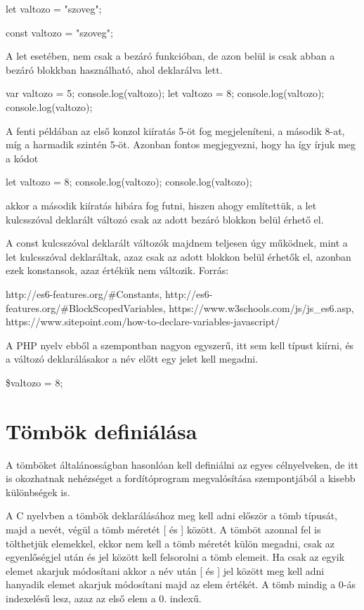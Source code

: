 \begin{cpp}
	let valtozo = "szoveg";
	
	const valtozo = "szoveg";
\end{cpp}

A let esetében, nem csak a bezáró funkcióban, de azon belül is csak abban a bezáró blokkban használható, ahol deklarálva lett.

\begin{cpp}
	var valtozo = 5;
	console.log(valtozo);
	{
		let valtozo = 8;
		console.log(valtozo);
	}
	console.log(valtozo);
\end{cpp}

A fenti példában az első konzol kiíratás 5-öt fog megjeleníteni, a második 8-at, míg a harmadik szintén 5-öt. Azonban fontos megjegyezni, hogy ha így írjuk meg a kódot

\begin{cpp}
	{
		let valtozo = 8;
		console.log(valtozo);
	}
	console.log(valtozo);
\end{cpp}

akkor a második kiíratás hibára fog futni, hiszen ahogy említettük, a let kulcsszóval deklarált változó csak az adott bezáró blokkon belül érhető el.

A const kulcsszóval deklarált változók majdnem teljesen úgy működnek, mint a let kulcsszóval deklaráltak, azaz csak az adott blokkon belül érhetők el, azonban ezek konstansok, azaz értékük nem változik.
Forrás:

http://es6-features.org/\#Constants,
http://es6-features.org/\#BlockScopedVariables,
https://www.w3schools.com/js/js\_es6.asp,
https://www.sitepoint.com/how-to-declare-variables-javascript/

A PHP nyelv ebből a szempontban nagyon egyszerű, itt sem kell típust kiírni, és a változó deklarálásakor a név előtt egy \textdollar jelet kell megadni.

\begin{cpp}
	\$valtozo = 8;	
\end{cpp}

\section{Tömbök definiálása}

A tömböket általánosságban hasonlóan kell definiálni az egyes célnyelveken, de itt is okozhatnak nehézséget a fordítóprogram megvalósítása szempontjából a kisebb különbségek is.

A C nyelvben a tömbök deklarálásához meg kell adni először a tömb típusát, majd a nevét, végül a tömb méretét [ és ] között. A tömböt azonnal fel is tölthetjük elemekkel, ekkor nem kell a tömb méretét külön megadni, csak az egyenlőségjel után { és } jel között kell felsorolni a tömb elemeit.
Ha csak az egyik elemet akarjuk módosítani akkor a név után [ és ] jel között meg kell adni hanyadik elemet akarjuk módosítani majd az elem értékét. A tömb mindig a 0-ás indexelésű lesz, azaz az első elem a 0. indexű.

